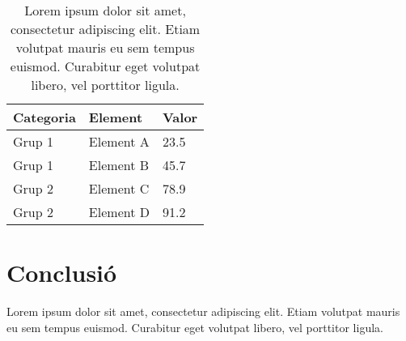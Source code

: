 \documentclass[a4paper,12pt]{article}
\begin{document}
\begin{table}[h!]
    \centering
    \begin{tabular}{|l|l|l|}
        \hline
        \textbf{Categoria} & \textbf{Element} & \textbf{Valor} \\ \hline
        Grup 1 & Element A & 23.5 \\ \hline
        Grup 1 & Element B & 45.7 \\ \hline
        Grup 2 & Element C & 78.9 \\ \hline
        Grup 2 & Element D & 91.2 \\ \hline
    \end{tabular}
    \caption{Lorem ipsum dolor sit amet, consectetur adipiscing elit. Etiam volutpat mauris eu sem tempus euismod. Curabitur eget volutpat libero, vel porttitor ligula.}
    \label{table:exemple2}
\end{table}

\section{Conclusió}
Lorem ipsum dolor sit amet, consectetur adipiscing elit. Etiam volutpat mauris eu sem tempus euismod. Curabitur eget volutpat libero, vel porttitor ligula.
\end{document}
